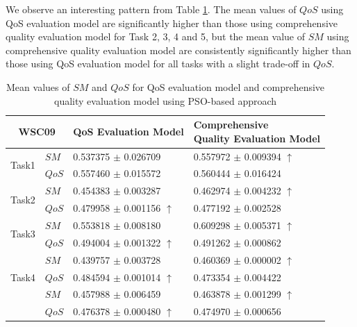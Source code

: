 \documentclass{llncs}
\begin{document}
We observe an interesting pattern from Table \ref{decisionTable}. The mean values of $QoS$ using QoS evaluation model are significantly higher than those using comprehensive quality evaluation model for Task 2, 3, 4 and 5,  but the mean value of $SM$ using comprehensive quality evaluation model are consistently significantly higher than those using QoS evaluation model for all tasks with a slight trade-off in $QoS$.

\begin{table}[]
\footnotesize
\centering
\caption{Mean values of $SM$ and $QoS$ for QoS evaluation model and comprehensive quality evaluation model using PSO-based approach}
\label{decisionTable}
\begin{tabular}{l|l|l|l}
\hline
\multicolumn{2}{c|}{WSC09}              & QoS Evaluation Model         &\shortstack{Comprehensive \\ Quality Evaluation Model} \\ \hline
\multirow{2}{*}{Task1}  &$SM$   &0.537375 $\pm$ 0.026709               &0.557972 $\pm$ 0.009394 $\uparrow$ \\ \cline{2-4}
                        &$QoS$  &0.557460 $\pm$ 0.015572               &0.560444 $\pm$ 0.016424                          \\ \hline
\multirow{2}{*}{Task2}  &$SM$   &0.454383 $\pm$ 0.003287               &0.462974 $\pm$ 0.004232 $\uparrow$ \\ \cline{2-4} 
                        &$QoS$  &0.479958 $\pm$ 0.001156 $\uparrow$    &0.477192 $\pm$ 0.002528 \\ \hline
\multirow{2}{*}{Task3}  &$SM$   &0.553818 $\pm$ 0.008180               &0.609298 $\pm$ 0.005371 $\uparrow$   \\ \cline{2-4} 
                        &$QoS$  &0.494004 $\pm$ 0.001322 $\uparrow$    &0.491262 $\pm$ 0.000862            \\ \hline
\multirow{3}{*}{Task4}  &$SM$   &0.439757 $\pm$ 0.003728               &0.460369 $\pm$ 0.000002 $\uparrow$ \\ \cline{2-4} 
                        &$QoS$  &0.484594 $\pm$ 0.001014 $\uparrow$    &0.473354 $\pm$ 0.004422  \\ \hline
\multirow{3}{*}{Task5}  &$SM$   &0.457988 $\pm$ 0.006459               &0.463878 $\pm$ 0.001299 $\uparrow$           \\ \cline{2-4} 
                        &$QoS$  &0.476378 $\pm$ 0.000480 $\uparrow$    &0.474970 $\pm$ 0.000656  \\ \hline                                                   
\end{tabular}
\end{table}
\end{document}
